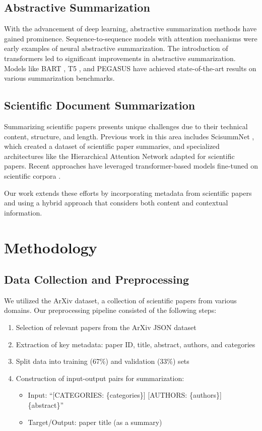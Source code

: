 \documentclass[conference]{IEEEtran}
\begin{document}
\subsection{Abstractive Summarization}
With the advancement of deep learning, abstractive summarization methods have gained prominence. Sequence-to-sequence models with attention mechanisms \cite{rush2015neural} were early examples of neural abstractive summarization. The introduction of transformers \cite{vaswani2017attention} led to significant improvements in abstractive summarization. Models like BART \cite{lewis2020bart}, T5 \cite{raffel2020exploring}, and PEGASUS \cite{zhang2020pegasus} have achieved state-of-the-art results on various summarization benchmarks.

\subsection{Scientific Document Summarization}
Summarizing scientific papers presents unique challenges due to their technical content, structure, and length. Previous work in this area includes ScisummNet \cite{yasunaga2019scisummnet}, which created a dataset of scientific paper summaries, and specialized architectures like the Hierarchical Attention Network \cite{yang2016hierarchical} adapted for scientific papers. Recent approaches have leveraged transformer-based models fine-tuned on scientific corpora \cite{cachola2020tldr}.

Our work extends these efforts by incorporating metadata from scientific papers and using a hybrid approach that considers both content and contextual information.

\section{Methodology}

\subsection{Data Collection and Preprocessing}
We utilized the ArXiv dataset, a collection of scientific papers from various domains. Our preprocessing pipeline consisted of the following steps:

\begin{enumerate}
\item Selection of relevant papers from the ArXiv JSON dataset
\item Extraction of key metadata: paper ID, title, abstract, authors, and categories
\item Split data into training (67\%) and validation (33\%) sets
\item Construction of input-output pairs for summarization:
   \begin{itemize}
   \item Input: ``[CATEGORIES: \{categories\}] [AUTHORS: \{authors\}] \{abstract\}''
   \item Target/Output: paper title (as a summary)
   \end{itemize}
\end{enumerate}
\end{document}
